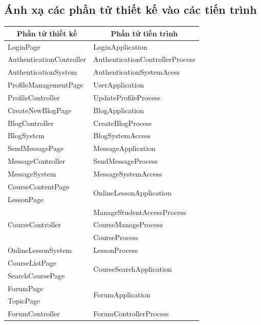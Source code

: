 \documentclass[./../main.tex]{subfiles}
\begin{document}
	\subsection{Ánh xạ các phần tử thiết kế vào các tiến trình}
	\begin{longtable}{|p{}|p{}|}
		\hline
		\multicolumn{1}{|c|}{\textbf{Phần tử thiết kế}} & \multicolumn{1}{c|}{\textbf{Phần tử tiến trình}} \\ \hline
		\endfirsthead
		\endhead
		LoginPage & LoginApplication        \\ \hline
		AuthenticationController & AuthenticationControllerProcess \\ \hline
		AuthenticationSystem	&AuthenticationSystemAcess \\ \hline
ProfileManagementPage	&UserApplication \\ \hline
ProfileController	&UpdateProfileProcess \\ \hline
CreateNewBlogPage	&BlogApplication \\ \hline
BlogController	&CreateBlogProcess \\ \hline
BlogSystem	&BlogSystemAccess \\ \hline
SendMessagePage	&MessageApplication \\ \hline
MessageController	&SendMessageProcess \\ \hline
MessageSystem	&MessageSystemAccess \\ \hline
CourseContentPage	& \multirow{2}{*}{OnlineLessonApplication} \\ 
LessonPage & \\ \hline
\multirow{3}{*}{CourseController}	&ManageStudentAccessProcess \\
	&CourseManageProcess \\
	&CourseProcess \\ \hline
OnlineLessonSystem	& LessonProcess \\ \hline
CourseListPage	& \multirow{2}{*}{CourseSearchApplication} \\
SearchCoursePage & \\ \hline
ForumPage	& \multirow{2}{*}{ForumApplication} \\
TopicPage	& \\ \hline
ForumController	&ForumControllerProcess \\ \hline

\end{longtable}
\end{document}
